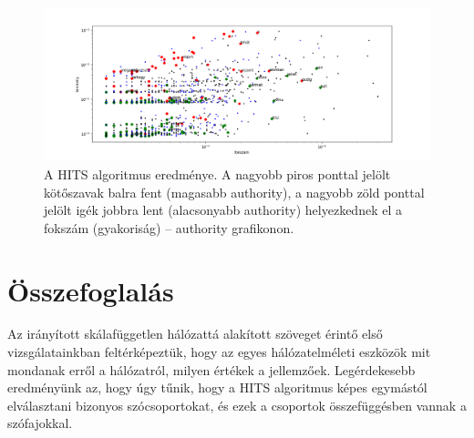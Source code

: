 \documentclass{llncs}
\begin{document}
\begin{figure}
\begin{center}
\includegraphics[width=25cm]{conv-verb-auth.png}
\caption{A HITS algoritmus eredménye.
A nagyobb piros ponttal jelölt kötőszavak balra fent
(magasabb authority),
a nagyobb zöld ponttal jelölt igék jobbra lent
(alacsonyabb authority)
helyezkednek el
  a fokszám (gyakoriság) -- authority grafikonon.}
\end{center}
\label{fig:hits-auth}
\end{figure}


\section{Összefoglalás}

Az irányított skálafüggetlen hálózattá alakított szöveget
érintő első vizsgálatainkban feltérképeztük,
hogy az egyes hálózatelméleti eszközök
mit mondanak erről a hálózatról, milyen értékek a jellemzőek.
%
Legérdekesebb eredményünk az,
hogy úgy tűnik, hogy a HITS algoritmus
képes egymástól elválasztani bizonyos szócsoportokat,
és ezek a csoportok összefüggésben vannak a szófajokkal.
\end{document}

